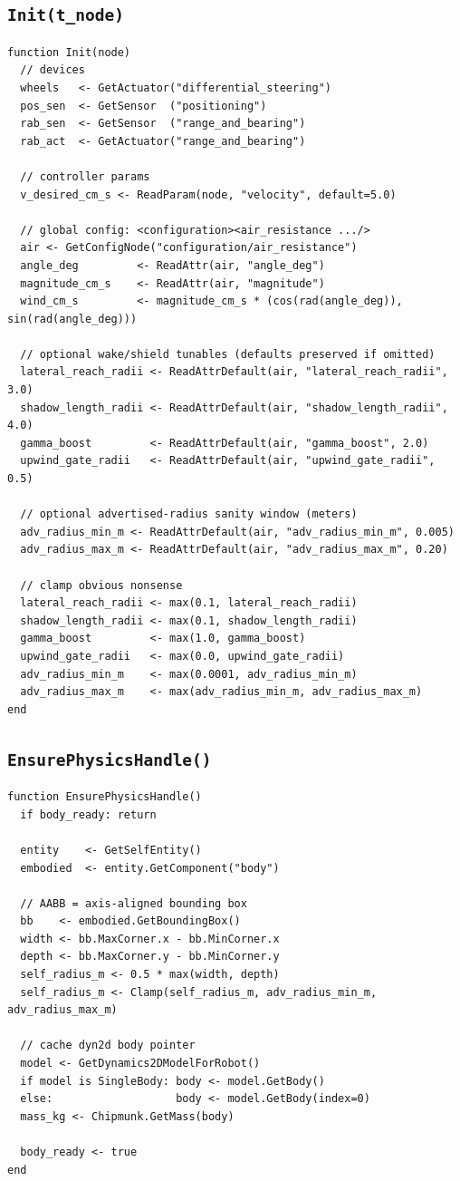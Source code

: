 \documentclass[11pt,a4paper]{article}
\begin{document}
\subsection{\texttt{Init(t\_node)}}
\begin{lstlisting}[language=pseudo]
function Init(node)
  // devices
  wheels   <- GetActuator("differential_steering")
  pos_sen  <- GetSensor  ("positioning")
  rab_sen  <- GetSensor  ("range_and_bearing")
  rab_act  <- GetActuator("range_and_bearing")

  // controller params
  v_desired_cm_s <- ReadParam(node, "velocity", default=5.0)

  // global config: <configuration><air_resistance .../>
  air <- GetConfigNode("configuration/air_resistance")
  angle_deg         <- ReadAttr(air, "angle_deg")
  magnitude_cm_s    <- ReadAttr(air, "magnitude")
  wind_cm_s         <- magnitude_cm_s * (cos(rad(angle_deg)), sin(rad(angle_deg)))

  // optional wake/shield tunables (defaults preserved if omitted)
  lateral_reach_radii <- ReadAttrDefault(air, "lateral_reach_radii", 3.0)
  shadow_length_radii <- ReadAttrDefault(air, "shadow_length_radii", 4.0)
  gamma_boost         <- ReadAttrDefault(air, "gamma_boost", 2.0)
  upwind_gate_radii   <- ReadAttrDefault(air, "upwind_gate_radii", 0.5)

  // optional advertised-radius sanity window (meters)
  adv_radius_min_m <- ReadAttrDefault(air, "adv_radius_min_m", 0.005)
  adv_radius_max_m <- ReadAttrDefault(air, "adv_radius_max_m", 0.20)

  // clamp obvious nonsense
  lateral_reach_radii <- max(0.1, lateral_reach_radii)
  shadow_length_radii <- max(0.1, shadow_length_radii)
  gamma_boost         <- max(1.0, gamma_boost)
  upwind_gate_radii   <- max(0.0, upwind_gate_radii)
  adv_radius_min_m    <- max(0.0001, adv_radius_min_m)
  adv_radius_max_m    <- max(adv_radius_min_m, adv_radius_max_m)
end
\end{lstlisting}

\subsection{\texttt{EnsurePhysicsHandle()}}
\begin{lstlisting}[language=pseudo]
function EnsurePhysicsHandle()
  if body_ready: return

  entity    <- GetSelfEntity()
  embodied  <- entity.GetComponent("body")

  // AABB = axis-aligned bounding box
  bb    <- embodied.GetBoundingBox()
  width <- bb.MaxCorner.x - bb.MinCorner.x
  depth <- bb.MaxCorner.y - bb.MinCorner.y
  self_radius_m <- 0.5 * max(width, depth)
  self_radius_m <- Clamp(self_radius_m, adv_radius_min_m, adv_radius_max_m)

  // cache dyn2d body pointer
  model <- GetDynamics2DModelForRobot()
  if model is SingleBody: body <- model.GetBody()
  else:                   body <- model.GetBody(index=0)
  mass_kg <- Chipmunk.GetMass(body)

  body_ready <- true
end
\end{lstlisting}
\end{document}
